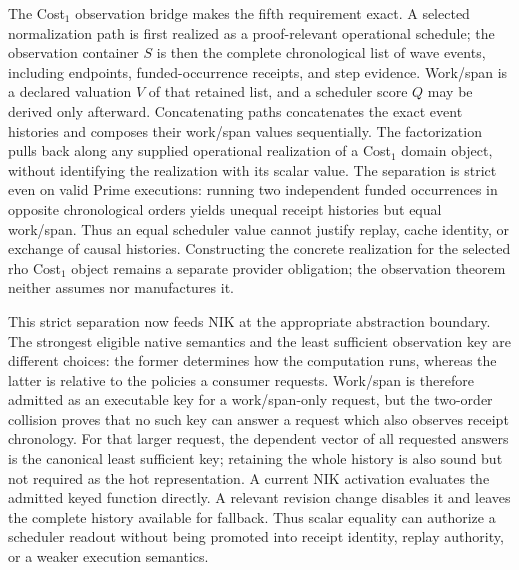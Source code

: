 \documentclass[11pt]{article}
\begin{document}
The Cost$_1$ observation bridge makes the fifth requirement exact.  A selected
normalization path is first realized as a proof-relevant operational schedule;
the observation container $S$ is then the complete chronological list of wave
events, including endpoints, funded-occurrence receipts, and step evidence.
Work/span is a declared valuation $V$ of that retained list, and a scheduler
score $Q$ may be derived only afterward.  Concatenating paths concatenates the
exact event histories and composes their work/span values sequentially.  The
factorization pulls back along any supplied operational realization of a
Cost$_1$ domain object, without identifying the realization with its scalar
value.  The separation is strict even on valid Prime executions: running two
independent funded occurrences in opposite chronological orders yields unequal
receipt histories but equal work/span.  Thus an equal scheduler value cannot
justify replay, cache identity, or exchange of causal histories.  Constructing
the concrete realization for the selected rho Cost$_1$ object remains a
separate provider obligation; the observation theorem neither assumes nor
manufactures it.

This strict separation now feeds NIK at the appropriate abstraction boundary.
The strongest eligible native semantics and the least sufficient observation
key are different choices: the former determines how the computation runs,
whereas the latter is relative to the policies a consumer requests.  Work/span
is therefore admitted as an executable key for a work/span-only request, but
the two-order collision proves that no such key can answer a request which also
observes receipt chronology.  For that larger request, the dependent vector of
all requested answers is the canonical least sufficient key; retaining the
whole history is also sound but not required as the hot representation.  A
current NIK activation evaluates the admitted keyed function directly.  A
relevant revision change disables it and leaves the complete history available
for fallback.  Thus scalar equality can authorize a scheduler readout without
being promoted into receipt identity, replay authority, or a weaker execution
semantics.
\end{document}
